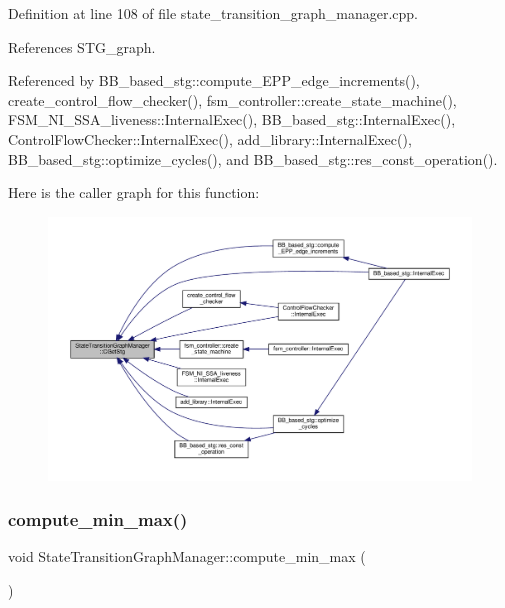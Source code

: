 Definition at line 108 of file state\+\_\+transition\+\_\+graph\+\_\+manager.\+cpp.



References S\+T\+G\+\_\+graph.



Referenced by B\+B\+\_\+based\+\_\+stg\+::compute\+\_\+\+E\+P\+P\+\_\+edge\+\_\+increments(), create\+\_\+control\+\_\+flow\+\_\+checker(), fsm\+\_\+controller\+::create\+\_\+state\+\_\+machine(), F\+S\+M\+\_\+\+N\+I\+\_\+\+S\+S\+A\+\_\+liveness\+::\+Internal\+Exec(), B\+B\+\_\+based\+\_\+stg\+::\+Internal\+Exec(), Control\+Flow\+Checker\+::\+Internal\+Exec(), add\+\_\+library\+::\+Internal\+Exec(), B\+B\+\_\+based\+\_\+stg\+::optimize\+\_\+cycles(), and B\+B\+\_\+based\+\_\+stg\+::res\+\_\+const\+\_\+operation().

Here is the caller graph for this function\+:
\nopagebreak
\begin{figure}[H]
\begin{center}
\leavevmode
\includegraphics[width=350pt]{d9/dfd/classStateTransitionGraphManager_aa4d2fce9798ca435e2366e999d368c11_icgraph}
\end{center}
\end{figure}
\mbox{\label{classStateTransitionGraphManager_ac686261b6a110f27d563e3dbdd1cde57}} 
\subsubsection{\texorpdfstring{compute\+\_\+min\+\_\+max()}{compute\_min\_max()}}
{\footnotesize\ttfamily void State\+Transition\+Graph\+Manager\+::compute\+\_\+min\+\_\+max (\begin{DoxyParamCaption}{ }\end{DoxyParamCaption})}



